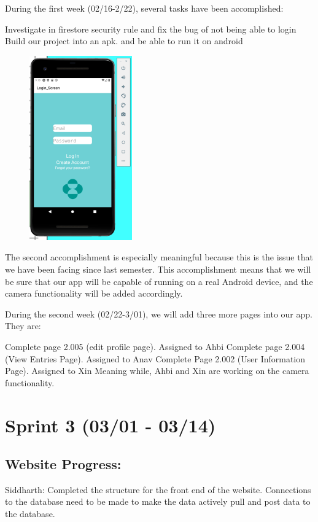 \documentclass[]{book}
\begin{document}
During the first week (02/16-2/22), several tasks have been
accomplished:

Investigate in firestore security rule and fix the bug of not being able
to login Build our project into an apk. and be able to run it on android

\begin{figure}
\centering
\includegraphics{images/mobile_signin.png}
\caption{}
\end{figure}

The second accomplishment is especially meaningful because this is the
issue that we have been facing since last semester. This accomplishment
means that we will be sure that our app will be capable of running on a
real Android device, and the camera functionality will be added
accordingly.

During the second week (02/22-3/01), we will add three more pages into
our app. They are:

Complete page 2.005 (edit profile page). Assigned to Ahbi Complete page
2.004 (View Entries Page). Assigned to Anav Complete Page 2.002 (User
Information Page). Assigned to Xin Meaning while, Ahbi and Xin are
working on the camera functionality.

\section{Sprint 3 (03/01 - 03/14)}\label{sprint-3-0301---0314}

\subsection{Website Progress:}\label{website-progress-2}

Siddharth: Completed the structure for the front end of the website.
Connections to the database need to be made to make the data actively
pull and post data to the database.
\end{document}
